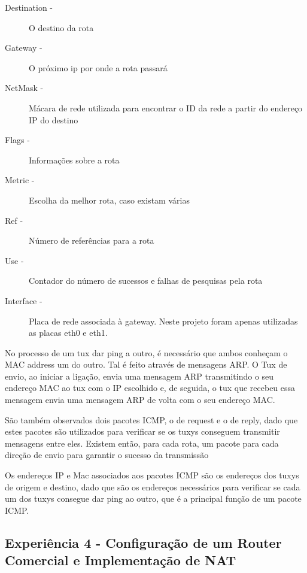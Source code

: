 \documentclass[11pt]{article}
\begin{document}
\begin{description}

\item[Destination -] O destino da rota

\item[Gateway -] O próximo ip por onde a rota passará

\item[NetMask -] Mácara de rede utilizada para encontrar o ID da rede a partir do endereço IP do destino

\item[Flags -] Informações sobre a rota

\item[Metric -] Escolha da melhor rota, caso existam várias

\item[Ref -] Número de referências para a rota

\item[Use -] Contador do número de sucessos e falhas de pesquisas pela rota

\item[Interface -] Placa de rede associada à gateway. Neste projeto foram apenas utilizadas as placas eth0 e eth1.

\end{description}

No processo de um tux dar ping a outro, é necessário que ambos conheçam o MAC address um do outro.
Tal é feito através de mensagens ARP. O Tux de envio, ao iniciar a ligação, envia uma mensagem ARP transmitindo o seu endereço MAC ao tux com o IP escolhido e, de seguida, o tux que recebeu essa mensagem envia uma mensagem ARP de volta com o seu endereço MAC.

São também observados dois pacotes ICMP, o de request e o de reply, dado que estes pacotes são utilizados para verificar se os tuxys conseguem transmitir mensagens entre eles. Existem então, para cada rota, um pacote para cada direção de envio para garantir o sucesso da transmissão


Os endereços IP e Mac associados aos pacotes ICMP são os endereços dos tuxys de origem e destino, dado que são os endereços necessários para verificar se cada um dos tuxys consegue dar ping ao outro, que é a principal função de um pacote ICMP. 

\subsection{Experiência 4 - Configuração de um Router Comercial e Implementação de NAT}
\end{document}
